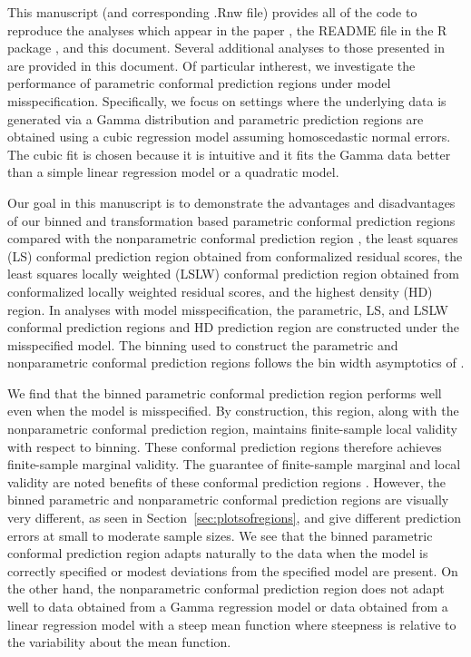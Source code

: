\documentclass[11pt]{article}\usepackage[]{graphicx}\usepackage[]{color}
\begin{document}
This manuscript (and corresponding .Rnw file) provides all of the code to 
reproduce the analyses which appear in the paper \citet{eck2019conformal}, the 
README file in the R package \citet{eck2018conformalR}, and this document.  
Several additional analyses to those presented in 
\citet{eck2019conformal} are provided in this document.  
Of particular intherest, we investigate the performance of parametric 
conformal prediction regions under model misspecification.  
Specifically, we focus on settings where the underlying data is generated 
via a Gamma distribution and parametric prediction regions are obtained using a 
cubic regression model assuming homoscedastic normal errors.  The cubic fit is 
chosen because it is intuitive and it fits the Gamma data better than a simple 
linear regression model or a quadratic model.  

Our goal in this manuscript is to demonstrate the advantages and disadvantages 
of our binned and transformation based parametric conformal prediction regions 
\citep{eck2019conformal} 
compared with the nonparametric conformal prediction region 
\citep{lei2014distribution}, the least squares (LS) conformal prediction 
region \citep{lei2018distribution} obtained from conformalized residual scores, 
the least squares locally weighted (LSLW) conformal prediction region 
\citep[Section 5.2]{lei2018distribution} obtained from conformalized locally 
weighted residual scores, and the highest density (HD) region. In analyses 
with model misspecification, the parametric, LS, and LSLW conformal prediction 
regions and HD prediction region are constructed under the misspecified 
model.  The binning used to construct the parametric and 
nonparametric conformal prediction regions follows the bin width asymptotics 
of \citet{lei2014distribution}.

We find that the binned parametric conformal prediction 
region performs well even when the model is misspecified.  By construction, 
this region, along with the nonparametric conformal prediction region, 
maintains finite-sample local validity with respect to binning.  
These conformal prediction regions therefore achieves finite-sample marginal 
validity.  The guarantee of finite-sample marginal and local validity are 
noted benefits of these conformal prediction regions 
\citep{lei2014distribution, eck2019conformal}.  
However, the binned parametric and nonparametric conformal prediction 
regions are visually very different, as seen in 
Section~\ref{sec:plotsofregions}, and give different prediction errors at 
small to moderate sample sizes.  We see that the binned parametric conformal 
prediction region adapts naturally to the data when the model is correctly 
specified or modest deviations from the specified model are present.  
On the other hand, the nonparametric conformal prediction region does not 
adapt well to data obtained from a Gamma regression model or data obtained 
from a linear regression model with a steep mean function where steepness is 
relative to the variability about the mean function.
\end{document}
